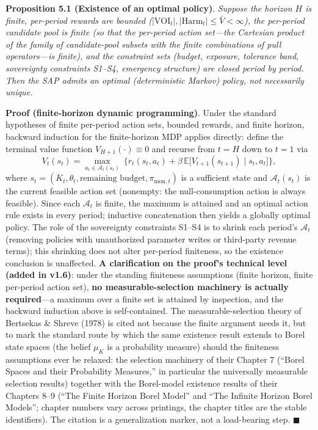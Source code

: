 \documentclass[
  11pt]{article}
\begin{document}
\textbf{Proposition 5.1 (Existence of an optimal policy)}. \emph{Suppose
the horizon \(H\) is finite, per-period rewards are bounded
(\(|\mathrm{VOI}_t|, |\mathrm{Harm}_t| \le \bar V < \infty\)), the
per-period candidate pool is finite (so that the per-period action
set---the Cartesian product of the family of candidate-pool subsets with
the finite combinations of pull operators---is finite), and the
constraint sets (budget, exposure, tolerance band, sovereignty
constraints S1--S4, emergency structure) are closed period by period.
Then the SAP admits an optimal (deterministic Markov) policy, not
necessarily unique.}

\textbf{Proof (finite-horizon dynamic programming)}. Under the standard
hypotheses of finite per-period action sets, bounded rewards, and finite
horizon, backward induction for the finite-horizon MDP applies directly:
define the terminal value function \(V_{H+1}(\cdot) \equiv 0\) and
recurse from \(t = H\) down to \(t = 1\) via
\[V_t(s_t) = \max_{a_t \in \mathcal{A}_t(s_t)}\ \Big\{ r_t(s_t, a_t) + \beta\,\mathbb{E}\big[V_{t+1}(s_{t+1}) \mid s_t, a_t\big] \Big\},\]
where
\(s_t = (K_t, \theta_t, \text{remaining budget}, \pi_{\mathrm{mon},t})\)
is a sufficient state and \(\mathcal{A}_t(s_t)\) is the current feasible
action set (nonempty: the null-consumption action is always feasible).
Since each \(\mathcal{A}_t\) is finite, the maximum is attained and an
optimal action rule exists in every period; inductive concatenation then
yields a globally optimal policy. The role of the sovereignty
constraints S1--S4 is to shrink each period's \(\mathcal{A}_t\)
(removing policies with unauthorized parameter writes or third-party
revenue terms); this shrinking does not alter per-period finiteness, so
the existence conclusion is unaffected. \textbf{A clarification on the
proof's technical level (added in v1.6)}: under the standing finiteness
assumptions (finite horizon, finite per-period action set), \textbf{no
measurable-selection machinery is actually required}---a maximum over a
finite set is attained by inspection, and the backward induction above
is self-contained. The measurable-selection theory of Bertsekas \&
Shreve (1978) is cited not because the finite argument needs it, but to
mark the standard route by which the same existence result extends to
Borel state spaces (the belief \(\mu_K\) is a probability measure)
should the finiteness assumptions ever be relaxed: the selection
machinery of their Chapter 7 (``Borel Spaces and their Probability
Measures,'' in particular the universally measurable selection results)
together with the Borel-model existence results of their Chapters 8--9
(``The Finite Horizon Borel Model'' and ``The Infinite Horizon Borel
Models''; chapter numbers vary across printings, the chapter titles are
the stable identifiers). The citation is a generalization marker, not a
load-bearing step. \(\blacksquare\)
\end{document}
